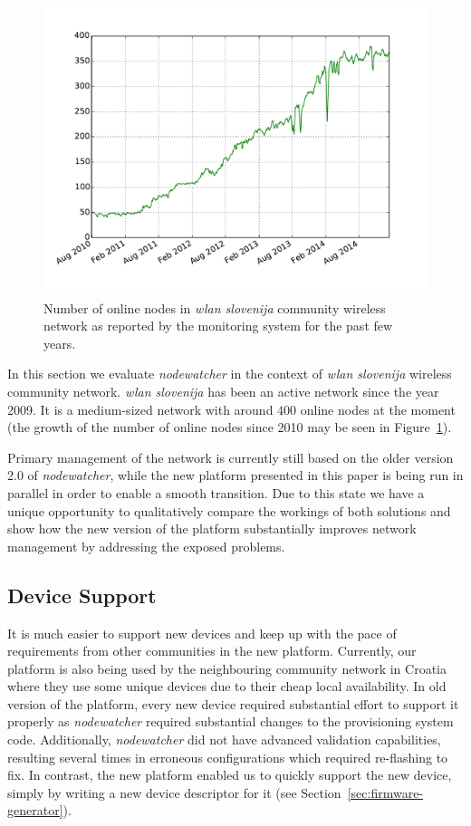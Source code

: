 \documentclass[5p,sort&compress]{elsarticle}
\newcommand{\nodewatcher}{\textit{nodewatcher}}
\newcommand{\wlanslovenija}{\textit{wlan slovenija}}
\begin{document}
\begin{figure}
  \centering
  \includegraphics[scale=0.45]{figures/wlansi-nodes-up.pdf}
  \caption{Number of online nodes in \wlanslovenija{} community wireless network as reported by the monitoring system for the past few years.}
  \label{fig:wlansi-nodes-up}
\end{figure}

In this section we evaluate \nodewatcher{} in the context of \wlanslovenija{} wireless community network.
\wlanslovenija{} has been an active network since the year 2009.
It is a medium-sized network with around $400$ online nodes at the moment (the growth of the number of online nodes since 2010 may be seen in Figure~\ref{fig:wlansi-nodes-up}).

Primary management of the network is currently still based on the older version 2.0 of \nodewatcher{}, while the new platform presented in this paper is being run in parallel in order to enable a smooth transition.
Due to this state we have a unique opportunity to qualitatively compare the workings of both solutions and show how the new version of the platform substantially improves network management by addressing the exposed problems.

\subsection{Device Support}

It is much easier to support new devices and keep up with the pace of requirements from other communities in the new platform.
Currently, our platform is also being used by the neighbouring community network in Croatia where they use some unique devices due to their cheap local availability.
In old version of the platform, every new device required substantial effort to support it properly as \nodewatcher{} required substantial changes to the provisioning system code.
Additionally, \nodewatcher{} did not have advanced validation capabilities, resulting several times in erroneous configurations which required re-flashing to fix.
In contrast, the new platform enabled us to quickly support the new device, simply by writing a new device descriptor for it (see Section~\ref{sec:firmware-generator}).
\end{document}
